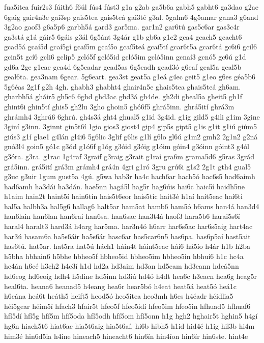 {fua5itea
fuir2s3
fúith6
f6úl
fús4
fúst3
g1a
g2ab
ga5b6a
gabh5
gabht6
ga3dao
g2ae
6gaig
gair4n3e
gai3sp
gais5tea
gais5teá
gai3té
g3al.
5galm6
4g5amar
gana3
g6and
3g2ao
gaof3
g6a5p6
garbh5á
gard3
gar5ma.
gar1n2
gar6tú
gas5c6ar
gas3c4r
ga3stá
g1á
gáir5
6gáis
g3ál
6g5ánt
3g4ár
g1b
gb6a
g1c2
gca4
gcach5
gcacht6
gcad5á
gcaí5d
gcaí5gí
gcaí5m
gcaí5o
gcaí5teá
gcaí5tí
gcar6t5a
gcar6tá
gc6i6
gcil6
gcin5t
gcí6
gcli6
gclip5
gcló5f
gcló5id
gcló5im
gcló5inn
gcnaí3
gcnó5
gc6ú
g1d
gd6a
2ge
g1eac
gea4d
6g5eadar
gead5as
6g5eadh
gead3ó
g6eaf
geal5a
geal5b
geal6ta.
gea3nam
6gear.
5g6eart.
gea3st
geat5a
g1eá
g4ec
geit5
g1eo
g6es
géa5b6
5g6éas
2g1f
g2h
4gh.
ghabh3
ghabht4
ghair4n5e
ghais5tea
ghais5teá
gh6am.
gharbh5á
gháir5
gh5c6
6ghd
ghd3ac
ghd3á
gh4de.
gh2di
gheal5a
gheit5
gh1f
ghint6i
ghin5tí
ghis5
gh2lu
3gho
ghoin5
ghó6f5
ghrá5inn.
ghrá5ití
ghrá3m
ghrámh4
3ghrú6
6ghrú.
gh4s3á
ght4
ghual5
g1id
3g4id.
g1ig
gild5
g4ili
g1im
3gine
3giní
g3inn.
3ginnt
gin5t6í
1gio
gios3
giost4
gip4
gip5s
gipt5
g1is
g1it
g1iú
giúm5
giús3
g1í
glae1
g4lán
gl4i6
5g6lic
3glif
g6lis
g1lí
g6lo
gl6ú
g1m2
gmh2
2g1n2
g2ná
gnó3l4
goin5
gó1c
g3ód
g1ó6f
g1óg
g3óid
g3óig
g1óim
góin4
g3óinn
góint3
g4ól
g3óra.
g3ra.
g1rac
1g4raf
3graif
g3raig
g3rait
g1raí
gra6m
grama5d6
g5ras
3grád
grá5inn.
grá5ití
grá3m
grámh4
grá4n
4gri
g1ró
3gru
grú6i
g1s2
2g1t
gth4
gual5
g3uc
g3uir
1gum
gust5a
4gú.
g5wa
hab3r
ha4c
hach6ar
hach5ó
hac6s5
had6aimh
had6amh
ha3dái
ha3dán.
hae5nn
hagá5l
hag5r
hag6úis
hai6c
haic5í
haidh5ne
h1aim
hain2t
haint5í
hain6tín
hais5t6eor
hais5tic
hait3é
h1aí
haít5eac
haí6ti
hal5a
halbh3a
hal5g6
hallag6
halt5ar
ham5at
hamb6
ham5ó
h6ams
han4á
han3d4
han6lain
han6lan
han6rai
han6sa.
han6sac
han3t4á
haof3
hara5b6
harai5s6í
haral4
haralt3
hard3á
h4arg
har5ma.
har3n4ó
h6arr
har6s5ac
har6s5aig
hart4ac
har3ú
hasam6a
ha5s6áir
ha5s6ár
hasc6ar
has5car6n5
has6pa.
has6p5aí
hast5ait
has6tú.
hat5ar.
hat5ra
hat5ú
hách1
háin4t
háint5eac
háí6
há5ío
h4ár
h1b
h2ba
h5bha
hbhain6
h5bhe
hbheo5f
hbheo5id
hbheo5im
hbheo5in
hbhuí6
h1c
hc4a
hc4án
h6cé
h3ch2
h4c3í
h1d
hd2a
hd3aim
hd3an
hd5eam
hd3eann
hdeá5nn
hd6eog
hd6eoig
hdh4
h5dine
hd5inn
hd3iú
hd4ó
h4dt
hea6c
h3eacn
hea6g
heag5r
heal6ta.
heana6
heanad5
h4eang
hea6r
hear5bó
h4eat
heat5á
heat5ó
heá1c
h6eána
heá6t
heáth5
heift5
heod5ó
heo5itea
heo3mh
h6es
h4éadr
héidlia5
héi5gear
héim5í
hfach3
hfair5t
hfeo5f
hfeo5idí
hfeo5im
hfeo5in
hfhuad5
hfhuaf6
hfí5dí
hfí5g
hfí5m
hfí5oda
hfí5odh
hfí5om
hfí5onn
h1g
hgh2
hghair5t
hghin5
h4gí
hg6n
hiach5t6
hiat6ac
hia5t6aig
hia5t6aí.
hi6b
hibh5
h1id
hid4é
h1ig
hil3b
hi4m
him3é
hin6d5ia
h4ine
hineach5
hineacht6
hin6ín
hin4íon
hin6ír
hin6ste.
hint4e
}
